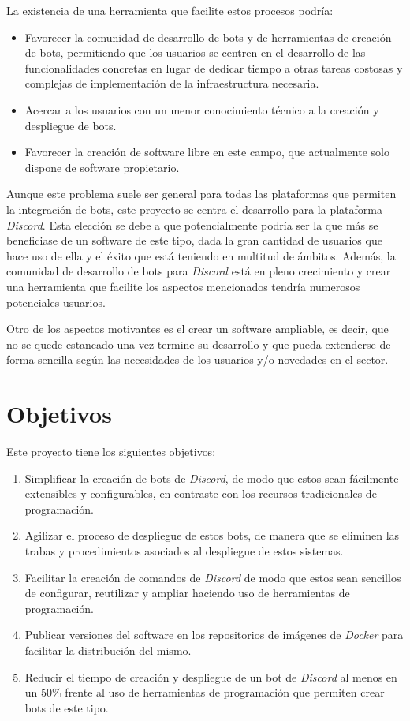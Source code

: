 La existencia de una herramienta que facilite estos procesos podría:

\begin{itemize}
	\item Favorecer la comunidad de desarrollo de bots y de herramientas de creación de bots, permitiendo que los usuarios se centren en el desarrollo de las funcionalidades concretas en lugar de dedicar tiempo a otras tareas costosas y complejas de implementación de la infraestructura necesaria.
	\item Acercar a los usuarios con un menor conocimiento técnico a la creación y despliegue de bots.
	\item Favorecer la creación de software libre en este campo, que actualmente solo dispone de software propietario.
\end{itemize}

Aunque este problema suele ser general para todas las plataformas que permiten la integración de bots, este proyecto se centra el desarrollo para la plataforma \textit{Discord}. Esta elección se debe a que potencialmente podría ser la que más se beneficiase de un software de este tipo, dada la gran cantidad de usuarios que hace uso de ella y el éxito que está teniendo en multitud de ámbitos. Además, la comunidad de desarrollo de bots para \textit{Discord} está en pleno crecimiento y crear una herramienta que facilite los aspectos mencionados tendría numerosos potenciales usuarios.

Otro de los aspectos motivantes es el crear un software ampliable, es decir, que no se quede estancado una vez termine su desarrollo y que pueda extenderse de forma sencilla según las necesidades de los usuarios y/o novedades en el sector.



\section{Objetivos}

Este proyecto tiene los siguientes objetivos:

\begin{enumerate}
	\item Simplificar la creación de bots de \textit{Discord}, de modo que estos sean fácilmente extensibles y configurables, en contraste con los recursos tradicionales de programación.
	\item Agilizar el proceso de despliegue de estos bots, de manera que se eliminen las trabas y procedimientos asociados al despliegue de estos sistemas.
	\item Facilitar la creación de comandos de \textit{Discord} de modo que estos sean sencillos de configurar, reutilizar y ampliar haciendo uso de herramientas de programación.
	\item Publicar versiones del software en los repositorios de imágenes de \textit{Docker} para facilitar la distribución del mismo.
	\item Reducir el tiempo de creación y despliegue de un bot de \textit{Discord} al menos en un 50\% frente al uso de herramientas de programación que permiten crear bots de este tipo.
\end{enumerate}



